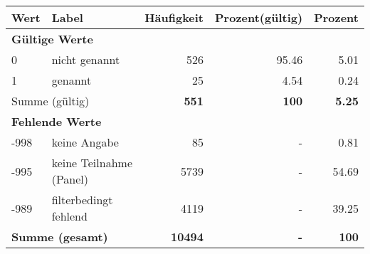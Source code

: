      \begin{longtable}{lXrrr}
     \toprule
     \textbf{Wert} & \textbf{Label} & \textbf{Häufigkeit} & \textbf{Prozent(gültig)} & \textbf{Prozent} \\
     \endhead
     \midrule
     \multicolumn{5}{l}{\textbf{Gültige Werte}}\\

     0 &
     \multicolumn{1}{X}{ nicht genannt   } &


       \num{526} &
       \num[round-mode=places,round-precision=2]{95,46} &
         \num[round-mode=places,round-precision=2]{5,01} \\

     1 &
     \multicolumn{1}{X}{ genannt   } &


       \num{25} &
       \num[round-mode=places,round-precision=2]{4,54} &
         \num[round-mode=places,round-precision=2]{0,24} \\
     \midrule
     \multicolumn{2}{l}{Summe (gültig)} &
       \textbf{\num{551}} &
     \textbf{100} &
       \textbf{\num[round-mode=places,round-precision=2]{5,25}} \\
     \multicolumn{5}{l}{\textbf{Fehlende Werte}}\\
       -998 &
       keine Angabe &
         \num{85} &
        - &
         \num[round-mode=places,round-precision=2]{0,81} \\
       -995 &
       keine Teilnahme (Panel) &
         \num{5739} &
        - &
         \num[round-mode=places,round-precision=2]{54,69} \\
       -989 &
       filterbedingt fehlend &
         \num{4119} &
        - &
         \num[round-mode=places,round-precision=2]{39,25} \\
     \midrule
     \multicolumn{2}{l}{\textbf{Summe (gesamt)}} &
          \textbf{\num{10494}} &
        \textbf{-} &
        \textbf{100} \\
     \bottomrule
     \end{longtable}
     
